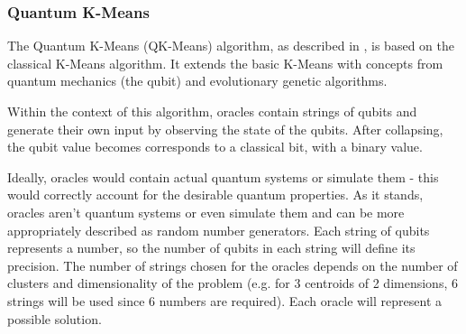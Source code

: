 

\subsubsection{Quantum K-Means}





The Quantum K-Means (QK-Means) algorithm, as described in \cite{Casper2012KMeans}, is based on the classical K-Means algorithm.
It extends the basic K-Means with concepts from quantum mechanics (the qubit) and evolutionary genetic algorithms.

Within the context of this algorithm, oracles contain strings of qubits and generate their own input by observing the state of the qubits.
After collapsing, the qubit value becomes corresponds to a classical bit, with a binary value.

Ideally, oracles would contain actual quantum systems or simulate them - this would correctly account for the desirable quantum properties.
As it stands, oracles aren't quantum systems or even simulate them and can be more appropriately described as random number generators.
Each string of qubits represents a number, so the number of qubits in each string will define its precision.
The number of strings chosen for the oracles depends on the number of clusters and dimensionality of the problem (e.g. for 3 centroids of 2 dimensions, 6 strings will be used since 6 numbers are required).
Each oracle will represent a possible solution.

